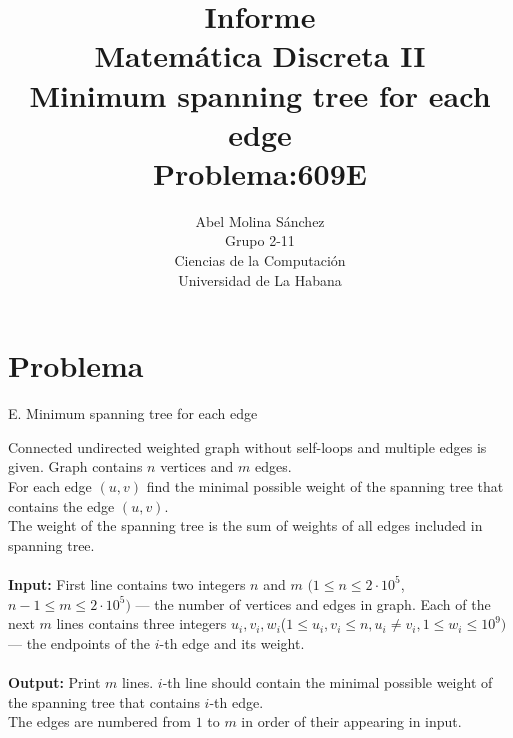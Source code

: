 \documentclass[12pt]{article}
\begin{document}
  \title{Informe\\
  Matem\'atica Discreta II\\
     Minimum spanning tree for each edge\\
     Problema:609E}
  \author{Abel Molina S\'anchez\\
  Grupo 2-11\\
  Ciencias de la Computaci\'on\\
  Universidad de La Habana}
    \maketitle  

\newpage

\section{Problema}



\begin{center}
 E. Minimum spanning tree for each edge
\end{center}
                                                 
Connected undirected weighted graph without self-loops and multiple edges is given. Graph contains $n$ vertices and $m$ edges.\\
For each edge $(u,v)$ find the minimal possible weight of the spanning tree that contains the edge $(u,v)$.\\
The weight of the spanning tree is the sum of weights of all edges included in spanning tree.\\
\\
\textbf{ Input:}
First line contains two integers $n$ and $m$ $(1\leq n \leq 2·10^5$, $n-1\leq m\leq 2·10^5)$ — the number of vertices and edges in graph.
Each of the next $m$ lines contains three integers $u_i,v_i,w_i$($1\leq u_i,v_i\leq n, u_i\neq v_i, 1\leq w_i \leq 10^9)$ — the endpoints of the $i$-th edge
and its weight.\\
\\
\textbf{Output:}
Print $m$ lines. $i$-th line should contain the minimal possible weight of the spanning tree that contains $i$-th edge.\\
The edges are numbered from $1$ to $m$ in order of their appearing in input.\\
\\
\end{document}
